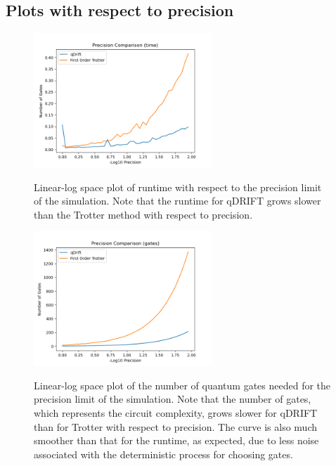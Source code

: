\documentclass[letterpaper, 11pt]{article}
\begin{document}
\subsection*{Plots with respect to precision}
\begin{figure}[H]
\centering
\includegraphics[width = 0.6\textwidth]{plots/e_precision_time_comp.png}
\label{html}
\caption{Linear-log space plot of runtime with respect to the precision limit of the simulation. Note that the runtime for qDRIFT grows slower than the Trotter method with respect to precision.}
\end{figure}
\begin{figure}[H]
\centering
\includegraphics[width = 0.6\textwidth]{plots/e_precision_gates_comp.png}
\label{html}
\caption{Linear-log space plot of the number of quantum gates needed for the precision limit of the simulation. Note that the number of gates, which represents the circuit complexity, grows slower for qDRIFT than for Trotter with respect to precision. The curve is also much smoother than that for the runtime, as expected, due to less noise associated with the deterministic process for choosing gates.}
\end{figure}
\end{document}
